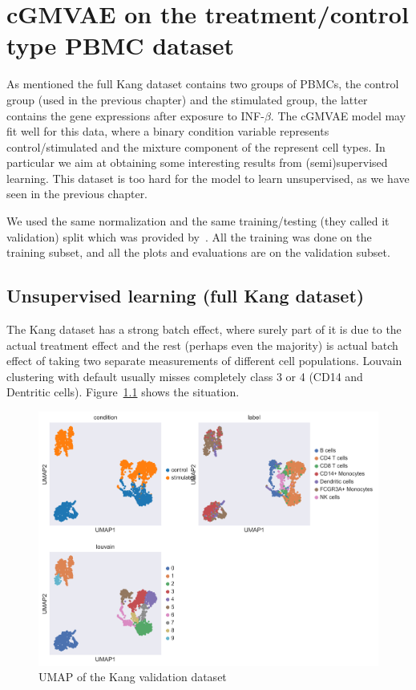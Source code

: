 \documentclass[11pt, a4paper]{report}
\theoremstyle{plain}
\theoremstyle{definition}
\theoremstyle{remark}
\begin{document}
\chapter{cGMVAE on the treatment/control type PBMC dataset}
As mentioned the full Kang dataset contains two groups of PBMCs, 
the control group (used in the previous chapter) and the stimulated group, the latter contains the gene
expressions after exposure to INF-$\beta$.
The cGMVAE model may fit well for this data, where a binary condition variable
represents control/stimulated and the mixture component of the represent cell
types. In particular we aim at obtaining some interesting results from
(semi)supervised learning. This dataset is too hard for the model to learn
unsupervised, as we have seen in the previous chapter.

We used the same normalization and the same training/testing (they called it validation) split
which was provided by~\cite{lotfollahi2019scgen}. All the training was done on
the training subset, and all the plots and evaluations are on the validation
subset.

\section{Unsupervised learning (full Kang dataset)}

The Kang dataset has a strong batch effect, where surely part of it is due to
the actual treatment effect and the rest (perhaps even the majority) is 
actual batch effect of taking two separate measurements of different cell
populations.
Louvain clustering with default usually misses completely class 3 or 4 (CD14 and
Dentritic cells).
Figure~\ref{fig:Kang_val_full} shows the situation.

\begin{figure}[h]
\centering
\includegraphics[width=1.1\textwidth]{images/Kang_val_full.png}
\caption{
UMAP of the Kang validation dataset
}
\label{fig:Kang_val_full}
\end{figure}
\end{document}
